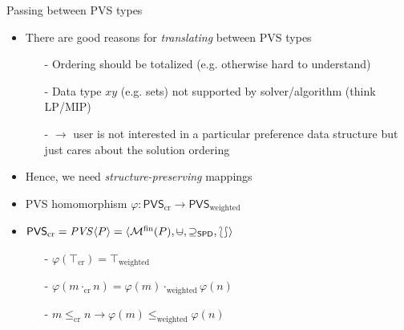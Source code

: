 \begin{frame}{Passing between PVS types}\small

\begin{itemize}
\item There are good reasons for \emph{translating} between PVS types
%
\begin{itemize}
\item[-] Ordering should be totalized (e.g. otherwise hard to understand)
\item[-] Data type $xy$ (e.g. sets) not supported by solver/algorithm (think LP/MIP)
\item[-] $\rightarrow$ user is \alert{not} interested in a particular preference data structure but just cares about the solution ordering
\end{itemize}
% 
\pause 
\vspace*{2ex}
\item Hence, we need \emph{structure-preserving} mappings \pause
\item PVS homomorphism $\varphi : \mathsf{PVS}_{\mathrm{cr}} \to  \mathsf{PVS}_{\mathrm{weighted}}$ \pause 
\item $\mathsf{PVS}_{\mathrm{cr}} = \mathit{PVS}\langle P \rangle = \langle \mathcal{M}^{\mathrm{fin}} (P), \mcup, \supseteq_{\mathsf{SPD}}, \lbag \rbag \rangle$
\begin{itemize}
\item[-] $\varphi(\top_{\mathrm{cr}}) = \top_{\mathrm{weighted}}$ \pause 
\item[-] $\varphi(m \cdot_{\mathrm{cr}} n) = \varphi(m) \cdot_{\mathrm{weighted}} \varphi(n)$ \pause 
\item[-] $m \leq_{\mathrm{cr}} n \rightarrow \varphi(m) \leq_{\mathrm{weighted}} \varphi(n)$ \pause 
\end{itemize}


\end{itemize}
\end{frame}
